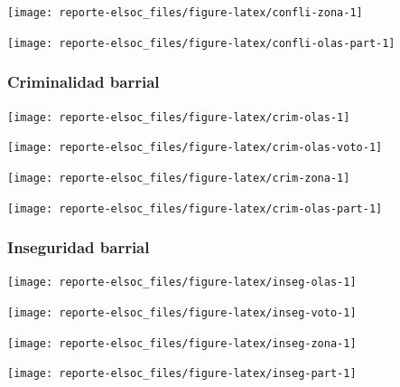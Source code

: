 \documentclass[
  12pt,
]{book}
\begin{document}
\begin{center}\texttt{[image: reporte-elsoc\_files/figure-latex/confli-zona-1]} \end{center}

\begin{center}\texttt{[image: reporte-elsoc\_files/figure-latex/confli-olas-part-1]} \end{center}

\hypertarget{criminalidad-barrial}{%
\subsubsection{Criminalidad barrial}\label{criminalidad-barrial}}

\begin{center}\texttt{[image: reporte-elsoc\_files/figure-latex/crim-olas-1]} \end{center}

\begin{center}\texttt{[image: reporte-elsoc\_files/figure-latex/crim-olas-voto-1]} \end{center}

\begin{center}\texttt{[image: reporte-elsoc\_files/figure-latex/crim-zona-1]} \end{center}

\begin{center}\texttt{[image: reporte-elsoc\_files/figure-latex/crim-olas-part-1]} \end{center}

\hypertarget{inseguridad-barrial}{%
\subsubsection{Inseguridad barrial}\label{inseguridad-barrial}}

\begin{center}\texttt{[image: reporte-elsoc\_files/figure-latex/inseg-olas-1]} \end{center}

\begin{center}\texttt{[image: reporte-elsoc\_files/figure-latex/inseg-voto-1]} \end{center}

\begin{center}\texttt{[image: reporte-elsoc\_files/figure-latex/inseg-zona-1]} \end{center}

\begin{center}\texttt{[image: reporte-elsoc\_files/figure-latex/inseg-part-1]} \end{center}
\end{document}
